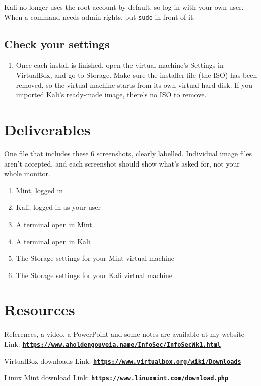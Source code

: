 \documentclass[12pt]{article}
\begin{document}
Kali no longer uses the root account by default, so log in with your own user. When a command needs admin rights, put \texttt{sudo} in front of it.

\subsection*{Check your settings}
\begin{enumerate}[start=8]
    \item Once each install is finished, open the virtual machine's Settings in VirtualBox, and go to Storage. Make sure the installer file (the ISO) has been removed, so the virtual machine starts from its own virtual hard disk. If you imported Kali's ready-made image, there's no ISO to remove.
\end{enumerate}

\section*{Deliverables}
One file that includes these 6 screenshots, clearly labelled. Individual image files aren't accepted, and each screenshot should show what's asked for, not your whole monitor.
\begin{enumerate}
    \item Mint, logged in
    \item Kali, logged in as your user
    \item A terminal open in Mint
    \item A terminal open in Kali
    \item The Storage settings for your Mint virtual machine
    \item The Storage settings for your Kali virtual machine
\end{enumerate}

\section*{Resources}
References, a video, a PowerPoint and some notes are available at my website
Link: \href{https://www.aholdengouveia.name/InfoSec/InfoSecWk1.html}{\textbf{\nolinkurl{https://www.aholdengouveia.name/InfoSec/InfoSecWk1.html}}}

VirtualBox downloads
Link: \href{https://www.virtualbox.org/wiki/Downloads}{\textbf{\nolinkurl{https://www.virtualbox.org/wiki/Downloads}}}

Linux Mint download
Link: \href{https://www.linuxmint.com/download.php}{\textbf{\nolinkurl{https://www.linuxmint.com/download.php}}}
\end{document}
